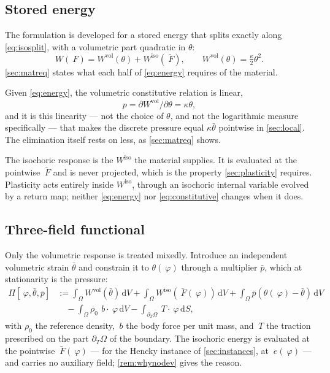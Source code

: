 \documentclass{article}
\newcommand{\F}{~F}
\newcommand{\edev}{~e}
\newcommand{\disp}{~\varphi}
\newcommand{\bT}{~T}
\newcommand{\diff}{\,\mathrm{d}}
\newcommand{\supvol}{^{\mathrm{vol}}}
\newcommand{\supiso}{^{\mathrm{iso}}}
\theoremstyle{definition}
\theoremstyle{plain}
\begin{document}
\subsection{Stored energy}
\label{sec:energy}

The formulation is developed for a stored energy that splits exactly along
\eqref{eq:isosplit}, with a volumetric part quadratic in $\theta$:
\begin{equation}
  \label{eq:energy}
  W(\F) = W\supvol(\theta) + W\supiso(\bar{\F}),
  \qquad
  W\supvol(\theta) = \tfrac{\kappa}{2}\theta^2 .
\end{equation}
\cref{sec:matreq} states what each half of \eqref{eq:energy} requires of the
material.

Given \eqref{eq:energy}, the volumetric constitutive relation is linear,
\begin{equation}
  \label{eq:constitutive}
  p = \partial W\supvol/\partial\theta = \kappa\theta ,
\end{equation}
and it is this linearity --- not the choice of $\theta$, and not the
logarithmic measure specifically --- that makes the discrete pressure equal
$\kappa\bar\theta$ pointwise in \cref{sec:local}. The elimination itself rests
on less, as \cref{sec:matreq} shows.

The isochoric response is the $W\supiso$ the material supplies. It is
evaluated at the pointwise $\bar{\F}$ and is never projected, which is the
property \cref{sec:plasticity} requires. Plasticity acts entirely inside
$W\supiso$, through an isochoric internal variable evolved by a return map;
neither \eqref{eq:energy} nor \eqref{eq:constitutive} changes when it does.

\subsection{Three-field functional}
\label{sec:hw}

Only the volumetric response is treated mixedly. Introduce an independent
volumetric strain $\bar\theta$ and constrain it to $\theta(\disp)$ through a
multiplier $\bar p$, which at stationarity is the pressure:
\begin{equation}
  \label{eq:hw}
  \begin{split}
    \Pi[\disp, \bar\theta, \bar p] & :=
    \int_\Omega W\supvol(\bar\theta) \diff V
    + \int_\Omega W\supiso\!\left(\bar{\F}(\disp)\right) \diff V
    + \int_\Omega \bar p \left(\theta(\disp) - \bar\theta\right) \diff V
    \\
    & \quad
    - \int_\Omega \rho_0\, ~b \cdot \disp \diff V
    - \int_{\partial_T\Omega} \bT \cdot \disp \diff S ,
  \end{split}
\end{equation}
with $\rho_0$ the reference density, $~b$ the body force per unit mass, and
$\bT$ the traction prescribed on the part $\partial_T\Omega$ of the boundary.
The isochoric energy is evaluated at the pointwise $\bar{\F}(\disp)$
--- for the Hencky instance of \cref{sec:instances}, at $\edev(\disp)$ ---
and carries no auxiliary field; \cref{rem:whynodev} gives the reason.
\end{document}
